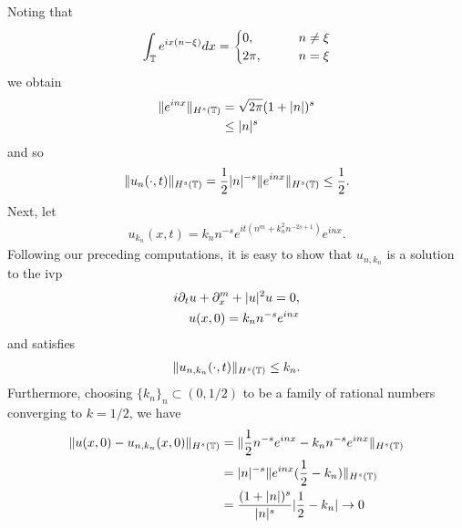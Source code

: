 %
%
Noting that
%
\begin{equation*}
	\begin{split}
		\int_{\mathbb{T}}e^{ix(n - \xi)}dx =
		\begin{cases}0, \qquad & n \neq \xi
			\\
			2 \pi, \qquad & n = \xi
		\end{cases}
	\end{split}
\end{equation*}
%
%
we obtain
%
%
\begin{equation}
	\label{1oscill-bound}
	\begin{split}
		\|e^{inx}\|_{H^{s}(\mathbb{T})} & = \sqrt{2 \pi}(1 + | n |)^{s}
		\\
		& \le | n |^{s}
	\end{split}
\end{equation}
%
%
and so
%
%
\begin{equation*}
	\begin{split}
		\|u_{n}(\cdot, t)\|_{H^s{(\mathbb{T})}} = \frac{1}{2}|n|^{-s}
		\|e^{inx}\|_{H^{s}(\mathbb{T})} \le \frac{1}{2}.
	\end{split}
\end{equation*}
%
%
Next, let
%
%
\begin{equation*}
	\begin{split}
		u_{k_{n}}(x,t) = k_{n}n^{-s}e^{it\left( n^{m} + k_{n}^2 n^{-2s+1}
		\right)}e^{inx}.
	\end{split}
\end{equation*}
%
%
Following our preceding computations, it is easy to show that $u_{n, k_{n}}$ is a solution to the ivp
%
%
\begin{equation}
	\label{1family-ivp}
	\begin{split}
		i\partial_t u + \partial_x^{m} + | u |^{2}u = 0,
		\\
		u(x,0) = k_{n}n^{-s}e^{inx}
	\end{split}
\end{equation}
%
%
and satisfies 
%
%
\begin{equation*}
	\begin{split}
		\|u_{n, k_{n}}(\cdot, t)\|_{H^{s}(\mathbb{T})} \le k_{n}.
	\end{split}
\end{equation*}
%
%
Furthermore, choosing $\{k_{n}\}_{n} \subset (0, 1/2)$ to be a family of
rational numbers converging to $k =1/2$, we have
%
%
\begin{equation*}
	\begin{split}
		\|u(x,0) - u_{n, k_{n}}(x, 0) \|_{H^s(\mathbb{T})} 
		& =
		\|\frac{1}{2}n^{-s}e^{inx} - k_{n}n^{-s}e^{inx} \|_{H^s(\mathbb{T})}
		\\
		& = | n |^{-s} \|e^{inx}(\frac{1}{2} - k_{n})\|_{H^s(\mathbb{T})}
		\\
		& = \frac{(1+| n |)^{s}}{|n|^{s}} |\frac{1}{2} - k_{n}| \to 0
	\end{split}
\end{equation*}
